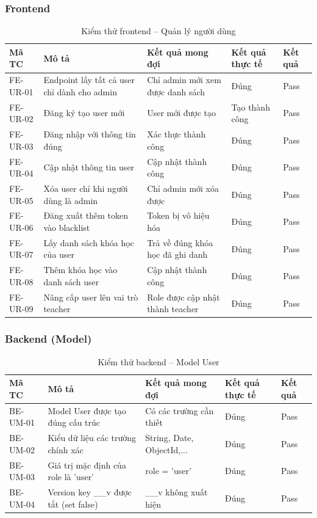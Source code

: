 \subsubsection{Frontend}
\begin{table}[H]
\centering
\caption{Kiểm thử frontend – Quản lý người dùng}
\label{tab:fe_user}
\begin{tabular}{|p{1.8cm}|p{4cm}|p{4cm}|p{2.2cm}|p{1.5cm}|}
\hline
\textbf{Mã TC} & \textbf{Mô tả} & \textbf{Kết quả mong đợi} & \textbf{Kết quả thực tế} & \textbf{Kết quả} \\ \hline
FE-UR-01 & Endpoint lấy tất cả user chỉ dành cho admin & Chỉ admin mới xem được danh sách & Đúng & Pass \\ \hline
FE-UR-02 & Đăng ký tạo user mới & User mới được tạo & Tạo thành công & Pass \\ \hline
FE-UR-03 & Đăng nhập với thông tin đúng & Xác thực thành công & Đúng & Pass \\ \hline
FE-UR-04 & Cập nhật thông tin user & Cập nhật thành công & Đúng & Pass \\ \hline
FE-UR-05 & Xóa user chỉ khi người dùng là admin & Chỉ admin mới xóa được & Đúng & Pass \\ \hline
FE-UR-06 & Đăng xuất thêm token vào blacklist & Token bị vô hiệu hóa & Đúng & Pass \\ \hline
FE-UR-07 & Lấy danh sách khóa học của user & Trả về đúng khóa học đã ghi danh & Đúng & Pass \\ \hline
FE-UR-08 & Thêm khóa học vào danh sách user & Cập nhật thành công & Đúng & Pass \\ \hline
FE-UR-09 & Nâng cấp user lên vai trò teacher & Role được cập nhật thành teacher & Đúng & Pass \\ \hline
\end{tabular}
\end{table}

\subsubsection{Backend (Model)}
\begin{table}[H]
\centering
\caption{Kiểm thử backend – Model User}
\label{tab:be_usermodel}
\begin{tabular}{|p{1.8cm}|p{4cm}|p{4cm}|p{2.2cm}|p{1.5cm}|}
\hline
\textbf{Mã TC} & \textbf{Mô tả} & \textbf{Kết quả mong đợi} & \textbf{Kết quả thực tế} & \textbf{Kết quả} \\ \hline
BE-UM-01 & Model User được tạo đúng cấu trúc & Có các trường cần thiết & Đúng & Pass \\ \hline
BE-UM-02 & Kiểu dữ liệu các trường chính xác & String, Date, ObjectId,... & Đúng & Pass \\ \hline
BE-UM-03 & Giá trị mặc định của role là 'user' & role = 'user' & Đúng & Pass \\ \hline
BE-UM-04 & Version key \_\_v được tắt (set false) & \_\_v không xuất hiện & Đúng & Pass \\ \hline
\end{tabular}
\end{table}

